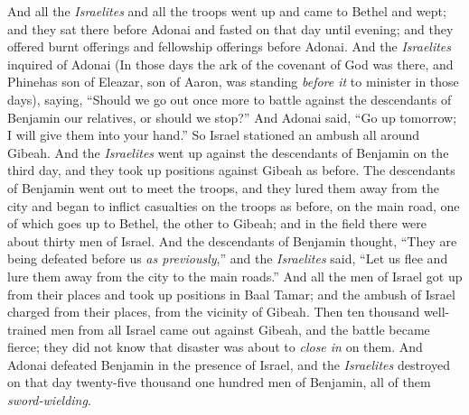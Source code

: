\begin{biblechapter}
\verse And all the \textit{Israelites} and all the troops went up and came to Bethel and wept; and they sat there before Adonai and fasted on that day until evening; and they offered burnt offerings and fellowship offerings before Adonai.
\verse And the \textit{Israelites} inquired of Adonai (In those days the ark of the covenant of God was there,
\verse and Phinehas son of Eleazar, son of Aaron, was standing \textit{before it} to minister in those days), saying, “Should we go out once more to battle against the descendants of Benjamin our relatives, or should we stop?” And Adonai said, “Go up tomorrow; I will give them into your hand.”
\verse So Israel stationed an ambush all around Gibeah.
\verse And the \textit{Israelites} went up against the descendants of Benjamin on the third day, and they took up positions against Gibeah as before.
\verse The descendants of Benjamin went out to meet the troops, and they lured them away from the city and began to inflict casualties on the troops as before, on the main road, one of which goes up to Bethel, the other to Gibeah; and in the field there were about thirty men of Israel.
\verse And the descendants of Benjamin thought, “They are being defeated before us \textit{as previously},” and the \textit{Israelites} said, “Let us flee and lure them away from the city to the main roads.”
\verse And all the men of Israel got up from their places and took up positions in Baal Tamar; and the ambush of Israel charged from their places, from the vicinity of Gibeah.
\verse Then ten thousand well-trained men from all Israel came out against Gibeah, and the battle became fierce; they did not know that disaster was about to \textit{close in} on them.
\verse And Adonai defeated Benjamin in the presence of Israel, and the \textit{Israelites} destroyed on that day twenty-five thousand one hundred men of Benjamin, all of them \textit{sword-wielding}.

\end{biblechapter}
